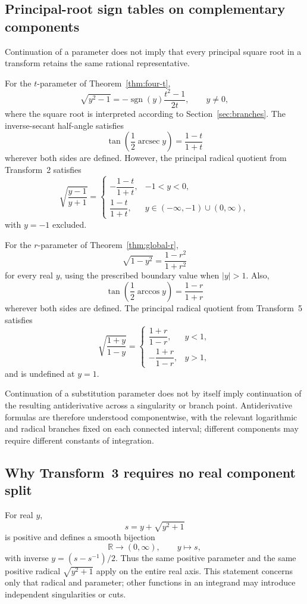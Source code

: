 \documentclass[11pt]{article}
\theoremstyle{remark}
\DeclareMathOperator{\arcsec}{arcsec}
\DeclareMathOperator{\sgn}{sgn}
\begin{document}
\subsection*{Principal-root sign tables on complementary components}

Continuation of a parameter does not imply that every principal square root in a transform retains the same rational representative.

For the $t$-parameter of Theorem~\ref{thm:four-t},
\[
\sqrt{y^2-1}=-\sgn(y)\frac{t^2-1}{2t},
\qquad y\ne0,
\]
where the square root is interpreted according to Section~\ref{sec:branches}. The inverse-secant half-angle satisfies
\[
\tan\!\left(\frac{1}{2}\arcsec y\right)=\frac{1-t}{1+t}
\]
wherever both sides are defined. However, the principal radical quotient from Transform~2 satisfies
\[
\sqrt{\frac{y-1}{y+1}}=
\begin{cases}
-\dfrac{1-t}{1+t},&-1<y<0,\\[2mm]
\dfrac{1-t}{1+t},&y\in(-\infty,-1)\cup(0,\infty),
\end{cases}
\]
with $y=-1$ excluded.

For the $r$-parameter of Theorem~\ref{thm:global-r},
\[
\sqrt{1-y^2}=\frac{1-r^2}{1+r^2}
\]
for every real $y$, using the prescribed boundary value when $|y|>1$. Also,
\[
\tan\!\left(\frac{1}{2}\arccos y\right)=\frac{1-r}{1+r}
\]
wherever both sides are defined. The principal radical quotient from Transform~5 satisfies
\[
\sqrt{\frac{1+y}{1-y}}=
\begin{cases}
\dfrac{1+r}{1-r},&y<1,\\[2mm]
-\dfrac{1+r}{1-r},&y>1,
\end{cases}
\]
and is undefined at $y=1$.

Continuation of a substitution parameter does not by itself imply continuation of the resulting antiderivative across a singularity or branch point. Antiderivative formulas are therefore understood componentwise, with the relevant logarithmic and radical branches fixed on each connected interval; different components may require different constants of integration.

\subsection*{Why Transform~3 requires no real component split}

For real $y$,
\[
s=y+\sqrt{y^2+1}
\]
is positive and defines a smooth bijection
\[
\mathbb R\longrightarrow(0,\infty),
\qquad
y\longmapsto s,
\]
with inverse $y=(s-s^{-1})/2$. Thus the same positive parameter and the same positive radical $\sqrt{y^2+1}$ apply on the entire real axis. This statement concerns only that radical and parameter; other functions in an integrand may introduce independent singularities or cuts.
\end{document}
